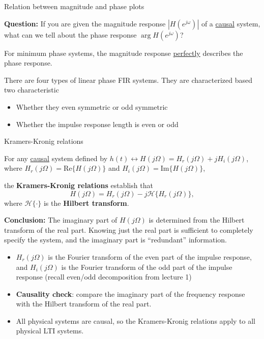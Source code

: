 \documentclass[10pt]{beamer}
\begin{document}
\begin{frame}{Relation between magnitude and phase plots}

\textbf{Question:} If you are given the magnitude response $|H(e^{j\omega})|$ of a \underline{causal} system, what can we tell about the phase response $\arg H(e^{j\omega})$?

\vspace{5mm}
\pause
For minimum phase systems, the magnitude response \underline{perfectly} describes the phase response.

There are four types of linear phase FIR systems. They are characterized based two characteristic
\begin{itemize}
	\item Whether they even symmetric or odd symmetric
	\item Whether the impulse response length is even or odd
\end{itemize}

\end{frame}

\begin{frame}{Kramers-Kronig relations}

For any \underline{causal} system defined by $h(t) \leftrightarrow H(j\Omega) = H_r(j\Omega) + jH_i(j\Omega)$, where $H_r(j\Omega) = \mathrm{Re}\{H(j\Omega)\}$ and $H_i(j\Omega) = \mathrm{Im}\{H(j\Omega)\}$,

the \textbf{Kramers-Kronig relations} establish that
\begin{equation*}
H(j\Omega) = H_r(j\Omega) - j\mathcal{H}\{H_r(j\Omega)\},
\end{equation*}
where $\mathcal{H}\{\cdot\}$ is the \textbf{Hilbert transform}.

\pause
\textbf{Conclusion:} The imaginary part of $H(j\Omega)$ is determined from the Hilbert transform of the real part. Knowing just the real part is sufficient to completely specify the system, and the imaginary part is ``redundant'' information.

\pause
\begin{itemize}
	\item $H_r(j\Omega)$ is the Fourier transform of the even part of the impulse response, and  $H_i(j\Omega)$ is the Fourier transform of the odd part of the impulse response (recall even/odd decomposition from lecture 1)
	\item \textbf{Causality check}: compare the imaginary part of the frequency response with the Hilbert transform of the real part.
	\item All physical systems are causal, so the Kramers-Kronig relations apply to all physical LTI systems.
\end{itemize}
\end{frame}
\end{document}
